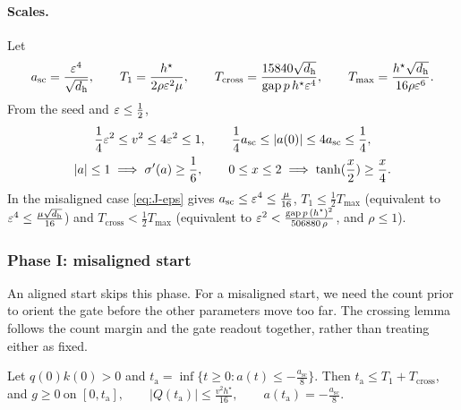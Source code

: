 \paragraph{Scales.} Let
\[
 a_{\mathrm{sc}}=\frac{\varepsilon^4}{\sqrt{d_{\mathrm h}}},\qquad T_1=\frac{h^\star}{2\rho\varepsilon^2\mu},\qquad
 T_{\mathrm{cross}}=\frac{15840\sqrt{d_{\mathrm h}}}{\mathrm{gap}\,p\,h^\star\varepsilon^4},\qquad T_{\max}=\frac{h^\star\sqrt{d_{\mathrm h}}}{16\rho\varepsilon^6}.
\]
From the seed and $\varepsilon\le\frac{1}{2}$,
\begin{equation}
 \begin{gathered}
 \tfrac{1}{4}\initscale^2\le v^2\le4\initscale^2\le1,\qquad \tfrac{1}{4}a_{\mathrm{sc}}\le|a(0)|\le4a_{\mathrm{sc}}\le\tfrac{1}{4},\\
 |a|\le1\implies\sigma'(a)\ge\tfrac{1}{6},\qquad 0\le x\le2\implies\tanh(\tfrac{x}{2})\ge\tfrac{x}{4} .
 \end{gathered}
 \label{eq:J-scales}
\end{equation}
In the misaligned case \cref{eq:J-eps} gives $a_{\mathrm{sc}}\le\varepsilon^4\le\frac{\mu}{16}$, $T_1\le\frac{1}{2}T_{\max}$ (equivalent to $\varepsilon^4\le\frac{\mu\sqrt{d_{\mathrm h}}}{16}$) and
$T_{\mathrm{cross}}<\frac{1}{2}T_{\max}$ (equivalent to $\varepsilon^2<\frac{\mathrm{gap}\,p\,(h^\star)^2}{506880\,\rho}$, and $\rho\le1$).

\subsubsection{Phase I: misaligned start}

An aligned start skips this phase. For a misaligned start, we need the count prior to orient the gate before the other parameters
move too far. The crossing lemma follows the count margin and the gate readout together, rather than treating either as fixed.

\begin{lemma}[Crossing]
\label{lem:J-cross}
Let $q(0)k(0)>0$ and $t_{\mathrm a}=\inf\{t\ge0:a(t)\le-\frac{a_{\mathrm{sc}}}{8}\}$. Then $t_{\mathrm a}\le T_1+T_{\mathrm{cross}}$, and
 $g\ge0\ \text{on }[0,t_{\mathrm a}],\qquad |Q(t_{\mathrm a})|\le\frac{v^2h^\star}{16},\qquad a(t_{\mathrm a})=-\frac{a_{\mathrm{sc}}}{8}.$ 
\end{lemma}

